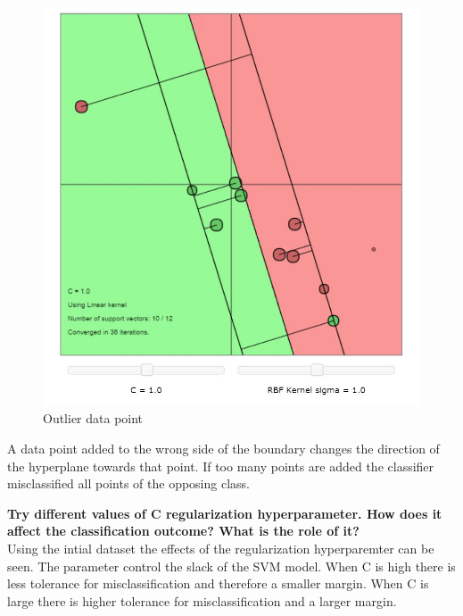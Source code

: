 \documentclass[11pt,oneside,a4paper]{article}
\begin{document}
\begin{figure}[h!]
	 \centering
	\includegraphics[scale=0.5]{../Figures/misclassified_linear_kernal}
	\caption{Outlier data point}
\end{figure}

A data point added to the wrong side of the boundary changes the direction of the hyperplane towards that point. If too many points are added the classifier misclassified all points of the opposing class. 

\textbf{Try different values of C regularization hyperparameter. How does it affect the classification outcome? What is the role of it?}\\
Using the intial dataset the effects of the regularization hyperparemter can be seen. The parameter control the slack of the SVM model. When C is high there is less tolerance for misclassification and therefore a smaller margin. When C is large there is higher tolerance for misclassification and a larger margin.
\end{document}
